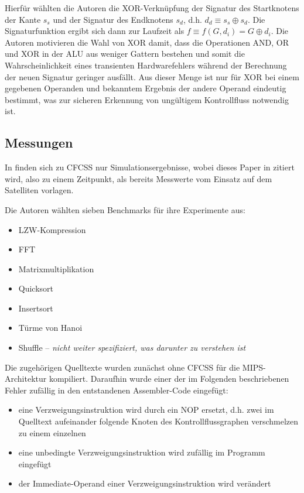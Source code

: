 \documentclass[11pt]{article}
\begin{document}
Hierfür wählten die Autoren die XOR-Verknüpfung der Signatur des Startknotens
der Kante $s_s$ und der Signatur des Endknotens $s_d$, d.h. $d_d \equiv s_s
\oplus s_d$. Die Signaturfunktion ergibt sich dann zur Laufzeit als $f \equiv
f(G, d_i) = G \oplus d_i$.  Die Autoren motivieren die Wahl von XOR damit, dass
die Operationen AND, OR und XOR in der ALU aus weniger Gattern bestehen und
somit die Wahrscheinlichkeit eines transienten Hardwarefehlers während der
Berechnung der neuen Signatur geringer ausfällt. Aus dieser Menge ist nur für
XOR bei einem gegebenen Operanden und bekanntem Ergebnis der andere Operand
eindeutig bestimmt, was zur sicheren Erkennung von ungültigem Kontrollfluss
notwendig ist.

\subsection{Messungen}

In \cite{oh-2002-control} finden sich zu CFCSS nur Simulationsergebnisse, wobei
dieses Paper in \cite{argos-2002-lessons} zitiert wird, also zu einem
Zeitpunkt, als bereits Messwerte vom Einsatz auf dem Satelliten vorlagen.

Die Autoren wählten sieben Benchmarks für ihre Experimente aus:

\begin{itemize}
  \item LZW-Kompression
  \item FFT
  \item Matrixmultiplikation
  \item Quicksort
  \item Insertsort
  \item Türme von Hanoi
  \item Shuffle – \emph{nicht weiter spezifiziert, was darunter zu verstehen ist}
\end{itemize}

Die zugehörigen Quelltexte wurden zunächst ohne CFCSS für die MIPS-Architektur
kompiliert. Daraufhin wurde einer der im Folgenden beschriebenen Fehler
zufällig in den entstandenen Assembler-Code eingefügt:

\begin{itemize}
  \item eine Verzweigungsinstruktion wird durch ein NOP ersetzt,
        d.h. zwei im Quelltext aufeinander folgende Knoten des Kontrollflussgraphen
        verschmelzen zu einem einzelnen
  \item eine unbedingte Verzweigungsinstruktion wird zufällig im Programm eingefügt
  \item der Immediate-Operand einer Verzweigungsinstruktion wird verändert
\end{itemize}
\end{document}
